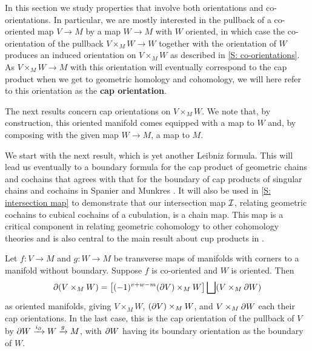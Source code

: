 In this section we study properties that involve both orientations and co-orientations.
In particular, we are mostly interested in the pullback of a co-oriented map $V \to M$ by a map $W \to M$ with $W$ oriented, in which case the co-orientation of the pullback $V \times_M W \to W$ together with the orientation of $W$ produces an induced orientation on $V \times_M W$ as described in \cref{S: co-orientations}.
As $V \times_M W \to M$ with this orientation will eventually correspond to the cap product when we get to geometric homology and cohomology, we will here refer to this orientation as the \textbf{cap orientation}.

The next results concern cap orientations on $V \times_M W$.
We note that, by construction, this oriented manifold comes equipped with a map to $W$ and, by composing with the given map $W \to M$, a map to $M$.

We start with the next result, which is yet another Leibniz formula.
This will lead us eventually to a boundary formula for the cap product of geometric chains and cochains that agrees with that for the boundary of cap products of singular chains and cochains in Spanier \cite[Section 5.6.15]{Span81} and Munkres \cite[Section 66]{Mun84}.
It will also be used in \cref{S: intersection map} to demonstrate that our intersection map $\mathcal{I}$, relating geometric cochains to cubical cochains of a cubulation, is a chain map.
This map is a critical component in relating geometric cohomology to other cohomology theories and is also central to the main result about cup products in \cite{FMS-flows}.

\begin{proposition}\label{P: Leibniz cap}
	Let $f \colon V \to M$ and $g \colon W \to M$ be transverse maps of manifolds with corners to a manifold without boundary.
	Suppose $f$ is co-oriented and $W$ is oriented.
	Then $$\partial(V \times_M W) = \left[(-1)^{v+w-m} (\partial V) \times_M W\right] \bigsqcup (V \times_M \partial W)$$
	as oriented manifolds, giving $V \times_M W$, $(\partial V) \times_M W$, and $V \times_M \partial W$ each their cap orientations.
	In the last case, this is the cap orientation of the pullback of $V$ by $\partial W \xrightarrow{i_{\partial}} W \xrightarrow{g} M$, with $\partial W$ having its boundary orientation as the boundary of $W$.
\end{proposition}

